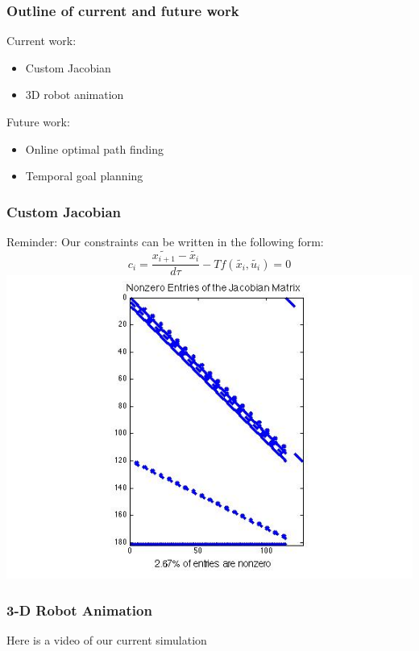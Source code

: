 \documentclass{beamer}
\newcommand{\ut}[1]{\ensuremath{\tilde{#1}}}
\begin{document}
\begin{frame}
\frametitle{Outline of current and future work}
Current work:
\begin{itemize}
\item Custom Jacobian
\item 3D robot animation
\end{itemize}
Future work:
\begin{itemize}
\item Online optimal path finding
\item Temporal goal planning
\end{itemize}

\end{frame}

\begin{frame}
\frametitle{Custom Jacobian}
Reminder: Our constraints can be written in the following form:
$$c_i = \frac{\ut{x_{i+1}} -\ut{ x_i}}{d\tau} - Tf(\ut{x_i},\ut{u_i}) = 0$$
\includegraphics[width=0.75\linewidth,height=0.55\textheight]{Spy_Jacobian.jpg}

\end{frame}


\begin{frame}
\frametitle{3-D Robot Animation}
Here is a video of our current simulation

\end{frame}
\end{document}
